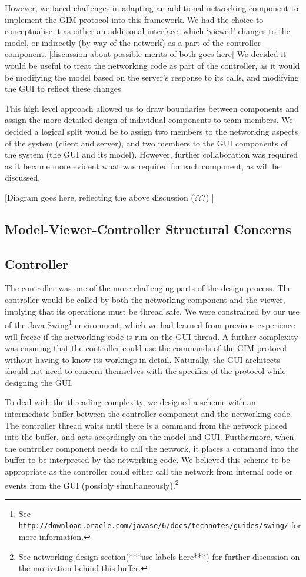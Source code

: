 However, we faced challenges in adapting an additional networking component to implement the GIM protocol into this framework. We had the choice to conceptualise it as either an additional interface, which `viewed' changes to the model, or indirectly (by way of the network) as a part of the controller component. [discussion about possible merits of both goes here] We decided it would be useful to treat the networking code as part of the controller, as it would be modifying the model based on the server's response to its calls, and modifying the GUI to reflect these changes.
	
This high level approach allowed us to draw boundaries between components and assign the more detailed design of individual components to team members. We decided a logical split would be to assign two members to the networking aspects of the system (client and server), and two members to the GUI components of the system (the GUI and its model). However, further collaboration was required as it became more evident what was required for each component, as will be discussed.

[Diagram goes here, reflecting the above discussion (???) ]

\subsection {Model-Viewer-Controller Structural Concerns}

\subsection {Controller}

The controller was one of the more challenging parts of the design process. The controller would be called by both the networking component and the viewer, implying that its operations must be thread safe. We were constrained by our use of the Java Swing\footnote{See \texttt{http://download.oracle.com/javase/6/docs/technotes/guides/swing/} for more information.} environment, which we had learned from previous experience will freeze if the networking code is run on the GUI thread. A further complexity was ensuring that the controller could use the commands of the GIM protocol without having to know its workings in detail. Naturally, the GUI architects should not need to concern themselves with the specifics of the protocol while designing the GUI.

To deal with the threading complexity, we designed a scheme with an intermediate buffer between the controller component and the networking code. The controller thread waits until there is a command from the network placed into the buffer, and acts accordingly on the model and GUI. Furthermore, when the controller component needs to call the network, it places a command into the buffer to be interpreted by the networking code. We believed this scheme to be appropriate as the controller could either call the network from internal code or events from the GUI (possibly simultaneously).\footnote{See networking design section(***use labels here***) for further discussion on the motivation behind this buffer.}

